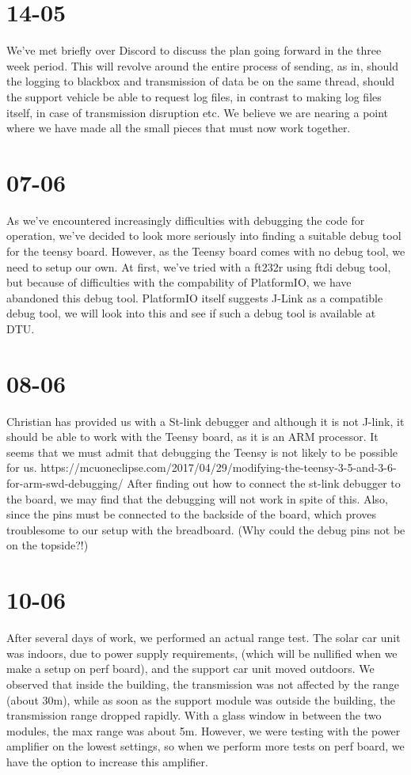 \documentclass[]{article}
\begin{document}
\section{14-05}
We've met briefly over Discord to discuss the plan going forward in the three week period. This will revolve around the entire process of sending, as in, should the logging to blackbox and transmission of data be on the same thread, should the support vehicle be able to request log files, in contrast to making log files itself, in case of transmission disruption etc. We believe we are nearing a point where we have made all the small pieces that must now work together.

\section{07-06}
As we've encountered increasingly difficulties with debugging the code for operation, we've decided to look more seriously into finding a suitable debug tool for the teensy board. However, as the Teensy board comes with no debug tool, we need to setup our own. At first, we've tried with a ft232r using ftdi debug tool, but because of difficulties with the compability of PlatformIO, we have abandoned this debug tool.
PlatformIO itself suggests J-Link as a compatible debug tool, we will look into this and see if such a debug tool is available at DTU.

\section{08-06}
Christian has provided us with a St-link debugger and although it is not J-link, it should be able to work with the Teensy board, as it is an ARM processor.
It seems that we must admit that debugging the Teensy is not likely to be possible for us. https://mcuoneclipse.com/2017/04/29/modifying-the-teensy-3-5-and-3-6-for-arm-swd-debugging/
After finding out how to connect the st-link debugger to the board, we may find that the debugging will not work in spite of this. Also, since the pins must be connected to the backside of the board, which proves troublesome to our setup with the breadboard. (Why could the debug pins not be on the topside?!)

\section{10-06}
After several days of work, we performed an actual range test. The solar car unit was indoors, due to power supply requirements, (which will be nullified when we make a setup on perf board), and the support car unit moved outdoors. We observed that inside the building, the transmission was not affected by the range (about 30m), while as soon as the support module was outside the building, the transmission range dropped rapidly. With a glass window in between the two modules, the max range was about 5m. However, we were testing with the power amplifier on the lowest settings, so when we perform more tests on perf board, we have the option to increase this amplifier.
\end{document}
